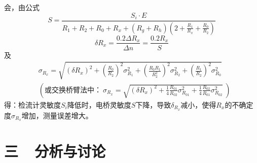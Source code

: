 \documentclass[a4paper]{ctexbook}
\begin{document}
    \noindent 会，由公式
    \[
    S = \frac{S_i\cdot E}{R_1+R_2+R_0+R_x+(R_g+R_h)\left(2+\frac{R_1}{R_x}+\frac{R_0}{R_2}\right)}
    \]
    \[
    \delta R_x = \frac{0.2\Delta R_x}{\Delta n} = \frac{0.2R_x}{S}
    \]
    及
    \begin{align*}
        & \sigma_{R_x} = \sqrt{(\delta R_x)^2+\left(\frac{R_0}{R_2}\right)^2\sigma_{R_1}^2+\left(\frac{R_0R_1}{R_2^2}\right)^2\sigma_{R_2}^2+\left(\frac{R_1}{R_2}\right)^2\sigma_{R_0}^2} \\
        & \left(\text{或交换桥臂法中：}\ \sigma_{R_x} = \sqrt{(\delta R_x)^2+\frac{1}{4}\frac{R_{01}}{R_{02}}\sigma_{R_{01}}^2+\frac{1}{4}\frac{R_{02}}{R_{01}}\sigma_{R_{02}}^2}\ \right)
    \end{align*}
    得：检流计灵敏度$S_i$降低时，电桥灵敏度$S$下降，导致$\delta_{R_x}$减小，使得$R_x$的不确定度$\sigma_{R_x}$增加，测量误差增大。

    \newpage
    \section*{ 三\ \ 分析与讨论}
\end{document}
